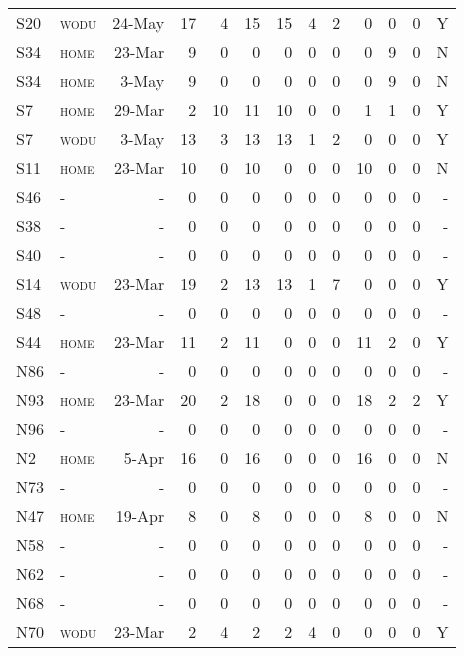 {\begin{landscape}
\begin{Spacing}{1}
\begin{longtable}[l]{@{}llrrrrrrrrrrr}
S20 & \textsc{wodu} & 24-May & 17 & 4 & 15 & 15 & 4 & 2 & 0 & 0 & 0 & Y \tabularnewline
S34 & \textsc{home} & 23-Mar & 9 & 0 & 0 & 0 & 0 & 0 & 0 & 9 & 0 & N \tabularnewline
S34 & \textsc{home} & 3-May & 9 & 0 & 0 & 0 & 0 & 0 & 0 & 9 & 0 & N \tabularnewline
S7 & \textsc{home} & 29-Mar & 2 & 10 & 11 & 10 & 0 & 0 & 1 & 1 & 0 & Y \tabularnewline
S7 & \textsc{wodu} & 3-May & 13 & 3 & 13 & 13 & 1 & 2 & 0 & 0 & 0 & Y \tabularnewline
S11 & \textsc{home} & 23-Mar & 10 & 0 & 10 & 0 & 0 & 0 & 10 & 0 & 0 & N \tabularnewline
S46 & - & - & 0 & 0 & 0 & 0 & 0 & 0 & 0 & 0 & 0 & - \tabularnewline
S38 & - & - & 0 & 0 & 0 & 0 & 0 & 0 & 0 & 0 & 0 & - \tabularnewline
S40 & - & - & 0 & 0 & 0 & 0 & 0 & 0 & 0 & 0 & 0 & - \tabularnewline
S14 & \textsc{wodu} & 23-Mar & 19 & 2 & 13 & 13 & 1 & 7 & 0 & 0 & 0 & Y \tabularnewline
S48 & - & - & 0 & 0 & 0 & 0 & 0 & 0 & 0 & 0 & 0 & - \tabularnewline
S44 & \textsc{home} & 23-Mar & 11 & 2 & 11 & 0 & 0 & 0 & 11 & 2 & 0 & Y \tabularnewline
N86 & - & - & 0 & 0 & 0 & 0 & 0 & 0 & 0 & 0 & 0 & - \tabularnewline
N93 & \textsc{home} & 23-Mar & 20 & 2 & 18 & 0 & 0 & 0 & 18 & 2 & 2 & Y \tabularnewline
N96 & - & - & 0 & 0 & 0 & 0 & 0 & 0 & 0 & 0 & 0 & - \tabularnewline
N2 & \textsc{home} & 5-Apr & 16 & 0 & 16 & 0 & 0 & 0 & 16 & 0 & 0 & N \tabularnewline
N73 & - & - & 0 & 0 & 0 & 0 & 0 & 0 & 0 & 0 & 0 & - \tabularnewline
N47 & \textsc{home} & 19-Apr & 8 & 0 & 8 & 0 & 0 & 0 & 8 & 0 & 0 & N \tabularnewline
N58 & - & - & 0 & 0 & 0 & 0 & 0 & 0 & 0 & 0 & 0 & - \tabularnewline
N62 & - & - & 0 & 0 & 0 & 0 & 0 & 0 & 0 & 0 & 0 & - \tabularnewline
N68 & - & - & 0 & 0 & 0 & 0 & 0 & 0 & 0 & 0 & 0 & - \tabularnewline
N70 & \textsc{wodu} & 23-Mar & 2 & 4 & 2 & 2 & 4 & 0 & 0 & 0 & 0 & Y \tabularnewline
\bottomrule
\end{longtable}
\end{Spacing}
\end{landscape}
\clearpage
}